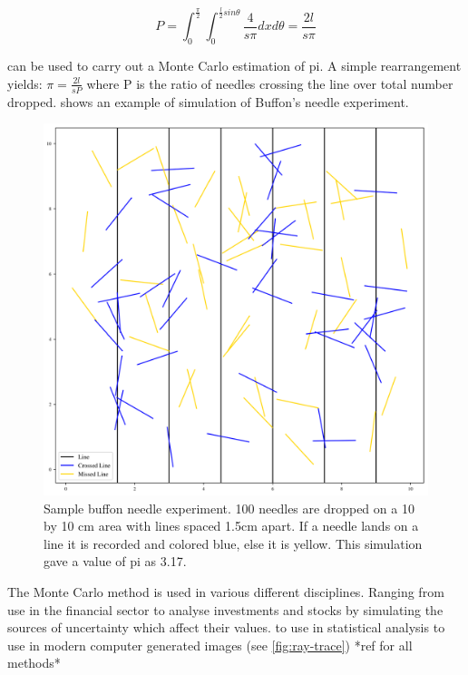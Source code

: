 \begin{equation}
P=\int_0^{\frac{\pi}{2}}\int_0^{\frac{l}{2}sin\theta}\frac{4}{s\pi}dx d\theta = \frac{2 l}{s \pi}\label{eqn:buffon}
\end{equation}


 can be used to carry out a Monte Carlo estimation of pi. A simple rearrangement yields: $\pi = \tfrac{2l}{sP}$ where P is the ratio of needles crossing the line over total number dropped.  shows an example of simulation of Buffon's needle experiment.\\

\begin{figure}
\centering
\includegraphics[width=\columnwidth/2]{./MCRT/images/buffon-pi=317.pdf}
\caption{Sample buffon needle experiment. 100 needles are dropped on a 10 by 10 cm area with lines spaced 1.5cm apart. If a needle lands on a line it is recorded and colored blue, else it is yellow. This simulation gave a value of pi as 3.17.}
\label{fig:buffon-needle}
\end{figure}

The Monte Carlo method is used in various different disciplines. Ranging from use in the financial sector to analyse investments and stocks by simulating the sources of uncertainty which affect their values. to use in statistical analysis to use in modern computer generated images (see \cref{fig:ray-trace}) *ref for all methods*

